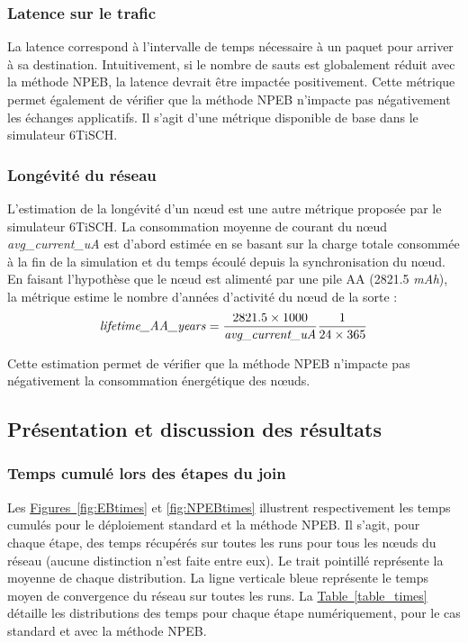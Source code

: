 \documentclass[]{report}
\newcommand{\wordlink}[2]{\hyperref[#2]{#1~\ref{#2}}}
\begin{document}
\subsubsection{Latence sur le trafic}

La latence correspond à l'intervalle de temps nécessaire à un paquet pour arriver à sa destination. Intuitivement, si le nombre de sauts est globalement réduit avec la méthode NPEB, la latence devrait être impactée positivement. Cette métrique permet également de vérifier que la méthode NPEB n'impacte pas négativement les échanges applicatifs. Il s'agit d'une métrique disponible de base dans le simulateur 6TiSCH.

\subsubsection{Longévité du réseau}
\label{metric_lifetime}

L'estimation de la longévité d'un nœud est une autre métrique proposée par le simulateur 6TiSCH. La consommation moyenne de courant du nœud \textit{avg\_current\_uA} est d'abord estimée en se basant sur la charge totale consommée à la fin de la simulation et du temps écoulé depuis la synchronisation du nœud. En faisant l'hypothèse que le nœud est alimenté par une pile AA (2821.5 \textit{mAh}), la métrique estime le nombre d'années d'activité du nœud de la sorte :
\[
\text{\textit{lifetime\_AA\_years}} = \frac{2821.5 \times 1000}{\text{\textit{avg\_current\_uA}}}
\frac{1}{24 \times 365}
\]

Cette estimation permet de vérifier que la méthode NPEB n'impacte pas négativement la consommation énergétique des nœuds.

\subsection{Présentation et discussion des résultats}

\subsubsection{Temps cumulé lors des étapes du join}
\label{results_times}

Les \wordlink{Figures}{fig:EBtimes} et \ref{fig:NPEBtimes} illustrent respectivement les temps cumulés pour le déploiement standard et la méthode NPEB. Il s'agit, pour chaque étape, des temps récupérés sur toutes les runs pour tous les nœuds du réseau (aucune distinction n'est faite entre eux). Le trait pointillé représente la moyenne de chaque distribution. La ligne verticale bleue représente le temps moyen de convergence du réseau sur toutes les runs. La \wordlink{Table}{table_times} détaille les distributions des temps pour chaque étape numériquement, pour le cas standard et avec la méthode NPEB.
\end{document}
